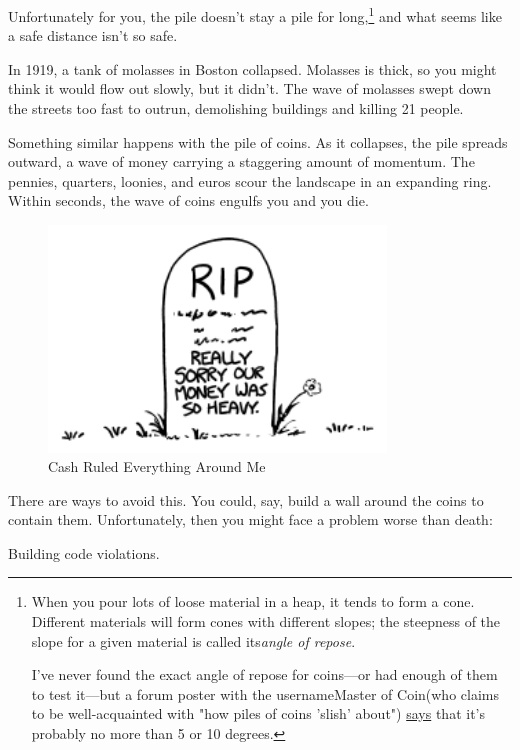 {{Unfortunately for you, the pile doesn't stay a pile for long,{\footnote{When you pour lots of loose material in a heap, it tends to form a cone. Different materials will form cones with different slopes; the steepness of the slope for a given material is called its\emph{angle of repose}.

I've never found the exact angle of repose for coins—or had enough of them to test it—but a forum poster with the usernameMaster of Coin(who claims to be well-acquainted with "how piles of coins 'slish' about") \href{http://asoiaf.westeros.org/index.php/topic/78114-the-hobbit-a-long-expected-spoiler-movie-thread/?p=3985923}{says} that it's probably no more than 5 or 10 degrees.} } and what seems like a safe distance isn't so safe.}

{In 1919, a tank of molasses in Boston collapsed. Molasses is thick, so you might think it would flow out slowly, but it didn't. The wave of molasses swept down the streets too fast to outrun, demolishing buildings and killing 21 people.}

{Something similar happens with the pile of coins. As it collapses, the pile spreads outward, a wave of money carrying a staggering amount of momentum. The pennies, quarters, loonies, and euros scour the landscape in an expanding ring. Within seconds, the wave of coins engulfs you and you die.}

\begin{figure}[!htbp]
\centering
\includegraphics[scale=0.5, max width=0.8\textwidth]{imgs/a/111/died.png}
\caption{Cash Ruled Everything Around Me}
\end{figure}

{There are ways to avoid this. You could, say, build a wall around the coins to contain them. Unfortunately, then you might face a problem worse than death:}

{Building code violations.}

}
